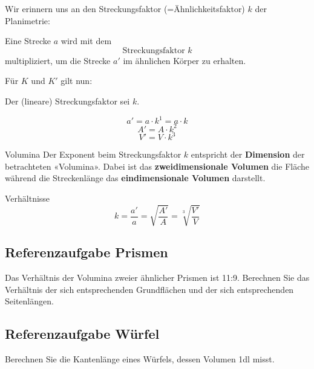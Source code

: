 Wir erinnern uns an den Streckungsfaktor (=Ähnlichkeitsfaktor) $k$ der Planimetrie:
\begin{definition}{}{}
  Eine Strecke $a$ wird mit dem
  $$\textrm{Streckungsfaktor} \,\, k$$
  multipliziert, um die Strecke $a'$ im ähnlichen Körper zu erhalten.
\end{definition}

Für $K$ und $K'$ gilt nun:

\begin{gesetz}{}{}
  Der (lineare) Streckungsfaktor sei $k$.

  $$a' = a \cdot{} k^1 = a\cdot{}k $$
  $$A' = A \cdot{} k^2 $$
  $$V' = V \cdot{} k^3 $$
\end{gesetz}

\begin{bemerkung}{Volumina}{}
Der Exponent beim Streckungsfaktor $k$ entspricht der \textbf{Dimension} der
betrachteten «Volumina». Dabei ist das \textbf{zweidimensionale Volumen} die
Fläche während die Streckenlänge das \textbf{eindimensionale Volumen} darstellt.
\end{bemerkung}

\begin{bemerkung}{Verhältnisse}{}
  $$k = \frac{a'}{a} = \sqrt{\frac{A'}{A}} = \sqrt[3\,\,\,]{\frac{V'}{V}}$$
\end{bemerkung}
\newpage


\subsection{Referenzaufgabe Prismen}
Das Verhältnis der Volumina zweier ähnlicher Prismen ist
11:9. Berechnen Sie das Verhältnis der sich entsprechenden Grundflächen und
der sich entsprechenden Seitenlängen.


\subsection{Referenzaufgabe Würfel}
Berechnen Sie die Kantenlänge eines Würfels, dessen Volumen 1dl misst.


\newpage
